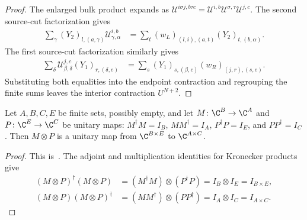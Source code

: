\begin{proof}\leanok
    The enlarged bulk product expands as
    $\mathcal U^{i\sigma j,b\tau c}
        =\mathcal U^{i,b}\mathcal U^{\sigma,\tau}\mathcal U^{j,c}$.
    The second source-cut factorization gives
    \begin{align}
        \sum_\gamma(Y_2)_{l,(a,\gamma)}\mathcal U^{i,b}_{\gamma,\alpha}
         & =\sum_t(w_L)_{(l,i),(a,t)}(Y_2)_{t,(b,\alpha)}.
    \end{align}
    The first source-cut factorization similarly gives
    \begin{align}
        \sum_\delta\mathcal U^{j,c}_{\beta,\delta}(Y_1)_{r,(\delta,e)}
         & =\sum_s(Y_1)_{s,(\beta,c)}(w_R)_{(j,r),(s,e)}.
    \end{align}
    Substituting both equalities into the endpoint contraction and
    regrouping the finite sums leaves the interior contraction $U^{N+2}$.
\end{proof}

\begin{lemma}
    \label{thm:matrix_unitary_between_kronecker}
    \leanok
    Let $A,B,C,E$ be finite sets, possibly empty, and let
    $M\colon\C^B\to\C^A$ and $P\colon\C^E\to\C^C$ be unitary maps:
    $M^\dagger M=I_B$, $MM^\dagger=I_A$, $P^\dagger P=I_E$, and
    $PP^\dagger=I_C$. Then $M\otimes P$ is a unitary map from
    $\C^{B\times E}$ to $\C^{A\times C}$.
\end{lemma}

\begin{proof}\leanok
    This is~\cite[``Kronecker product of unitary maps'']{QICLean2026Blueprint}.
    The adjoint and multiplication identities for Kronecker products give
    \begin{align}
        (M\otimes P)^\dagger(M\otimes P)
         & =(M^\dagger M)\otimes(P^\dagger P)
        =I_B\otimes I_E=I_{B\times E},        \\
        (M\otimes P)(M\otimes P)^\dagger
         & =(MM^\dagger)\otimes(PP^\dagger)
        =I_A\otimes I_C=I_{A\times C}.
    \end{align}
\end{proof}

